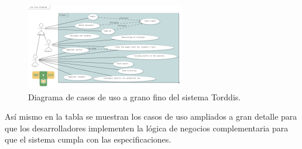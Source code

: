 \documentclass[a4paper,fleqn]{cas-sc}
\begin{document}
			\begin{figure}[hbt!]
				\centering
				\includegraphics[frame,scale=0.5, width=\linewidth]{figs/Figure_7}
				\caption{Diagrama de casos de uso a grano fino del sistema Torddis. \label{fig:Fine-GrainedUseCas}}
			\end{figure} 
			
			Así mismo en la tabla se muestran los casos de uso ampliados a gran detalle para que los desarrolladores implementen la lógica de negocios complementaria para que el sistema cumpla con las especificaciones.
			
\end{document}
